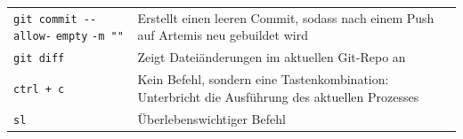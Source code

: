 \documentclass{article}
\begin{document}
\begin{longtable}{p{4cm}p{12cm}}
	\verb|git commit --allow-| \verb|empty| \verb|-m ""| & Erstellt einen leeren Commit, sodass nach einem Push auf Artemis neu gebuildet wird                               \\
	\verb|git diff|                                      & Zeigt Dateiänderungen im aktuellen Git-Repo an                                                                    \\
	\verb|ctrl + c|                                      & Kein Befehl, sondern eine Tastenkombination: Unterbricht die Ausführung des aktuellen Prozesses                   \\
	\verb|sl|                                            & Überlebenswichtiger Befehl                                                                                        \\
\end{longtable}
\end{document}
